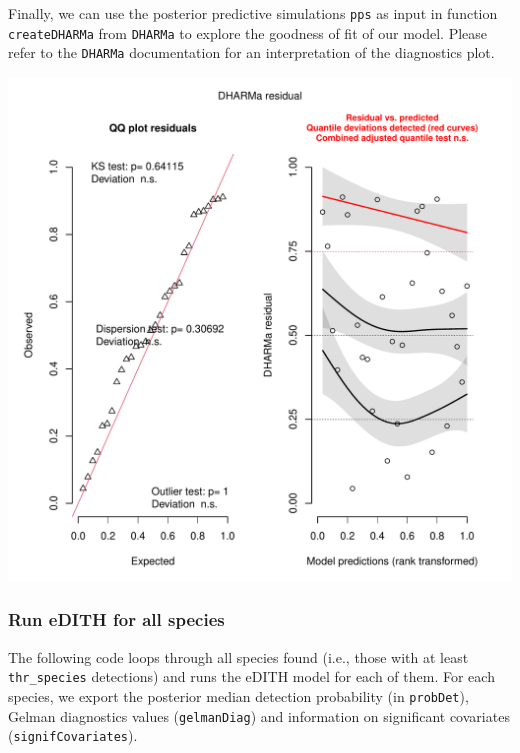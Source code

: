 \documentclass[
]{article}
\newenvironment{Shaded}{\begin{snugshade}}{\end{snugshade}}
\newcommand{\CommentTok}[1]{\textcolor[rgb]{0.56,0.35,0.01}{\textit{#1}}}
\newcommand{\FunctionTok}[1]{\textcolor[rgb]{0.13,0.29,0.53}{\textbf{#1}}}
\newcommand{\NormalTok}[1]{#1}
\newcommand{\OtherTok}[1]{\textcolor[rgb]{0.56,0.35,0.01}{#1}}
\newcommand{\SpecialCharTok}[1]{\textcolor[rgb]{0.81,0.36,0.00}{\textbf{#1}}}
\begin{document}
Finally, we can use the posterior predictive simulations \texttt{pps} as input in function \texttt{createDHARMa} from \texttt{DHARMa} to explore the goodness of fit of our model. Please refer to the \texttt{DHARMa} documentation for an interpretation of the diagnostics plot.

\begin{Shaded}
\end{Shaded}

\includegraphics{Illustrating_eDITH_files/figure-latex/unnamed-chunk-24-1.pdf}

\hypertarget{run-edith-for-all-species}{%
\subsubsection{Run eDITH for all species}\label{run-edith-for-all-species}}

The following code loops through all species found (i.e., those with at least \texttt{thr\_species} detections) and runs the eDITH model for each of them. For each species, we export the posterior median detection probability (in \texttt{probDet}), Gelman diagnostics values (\texttt{gelmanDiag}) and information on significant covariates (\texttt{signifCovariates}).
\end{document}
